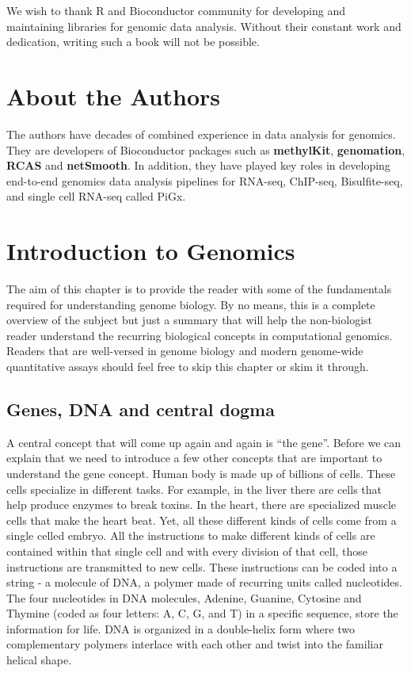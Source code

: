 \documentclass[12pt,]{krantz}
\theoremstyle{definition}
\theoremstyle{definition}
\theoremstyle{definition}
\theoremstyle{remark}
\begin{document}
We wish to thank R and Bioconductor community for developing and
maintaining libraries for genomic data analysis. Without their constant
work and dedication, writing such a book will not be possible.

\hypertarget{about-the-authors}{%
\chapter*{About the Authors}\label{about-the-authors}}


The authors have decades of combined experience in data analysis for
genomics. They are developers of Bioconductor packages such as
\textbf{methylKit}, \textbf{genomation}, \textbf{RCAS} and
\textbf{netSmooth}. In addition, they have played key roles in
developing end-to-end genomics data analysis pipelines for RNA-seq,
ChIP-seq, Bisulfite-seq, and single cell RNA-seq called PiGx.

\mainmatter

\hypertarget{intro}{%
\chapter{Introduction to Genomics}\label{intro}}

The aim of this chapter is to provide the reader with some of the
fundamentals required for understanding genome biology. By no means,
this is a complete overview of the subject but just a summary that will
help the non-biologist reader understand the recurring biological
concepts in computational genomics. Readers that are well-versed in
genome biology and modern genome-wide quantitative assays should feel
free to skip this chapter or skim it through.

\hypertarget{genes-dna-and-central-dogma}{%
\section{Genes, DNA and central
dogma}\label{genes-dna-and-central-dogma}}

A central concept that will come up again and again is ``the gene''.
Before we can explain that we need to introduce a few other concepts
that are important to understand the gene concept. Human body is made up
of billions of cells. These cells specialize in different tasks. For
example, in the liver there are cells that help produce enzymes to break
toxins. In the heart, there are specialized muscle cells that make the
heart beat. Yet, all these different kinds of cells come from a single
celled embryo. All the instructions to make different kinds of cells are
contained within that single cell and with every division of that cell,
those instructions are transmitted to new cells. These instructions can
be coded into a string - a molecule of DNA, a polymer made of recurring
units called nucleotides. The four nucleotides in DNA molecules,
Adenine, Guanine, Cytosine and Thymine (coded as four letters: A, C, G,
and T) in a specific sequence, store the information for life. DNA is
organized in a double-helix form where two complementary polymers
interlace with each other and twist into the familiar helical shape.
\end{document}
